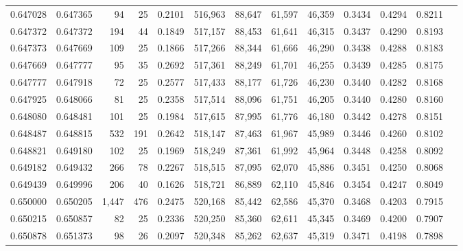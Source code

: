 \begin{tabular}{rrrrrrrrrrrrr}
0.647028 & 0.647365 &    94 &  25 &                                     0.2101 & 516,963 &  88,647 &  61,597 &  46,359 & 0.3434 & 0.4294 & 0.8211 \\
0.647372 & 0.647372 &   194 &  44 &                                     0.1849 & 517,157 &  88,453 &  61,641 &  46,315 & 0.3437 & 0.4290 & 0.8193 \\
0.647373 & 0.647669 &   109 &  25 &                                     0.1866 & 517,266 &  88,344 &  61,666 &  46,290 & 0.3438 & 0.4288 & 0.8183 \\
0.647669 & 0.647777 &    95 &  35 &                                     0.2692 & 517,361 &  88,249 &  61,701 &  46,255 & 0.3439 & 0.4285 & 0.8175 \\
0.647777 & 0.647918 &    72 &  25 &                                     0.2577 & 517,433 &  88,177 &  61,726 &  46,230 & 0.3440 & 0.4282 & 0.8168 \\
0.647925 & 0.648066 &    81 &  25 &                                     0.2358 & 517,514 &  88,096 &  61,751 &  46,205 & 0.3440 & 0.4280 & 0.8160 \\
0.648080 & 0.648481 &   101 &  25 &                                     0.1984 & 517,615 &  87,995 &  61,776 &  46,180 & 0.3442 & 0.4278 & 0.8151 \\
0.648487 & 0.648815 &   532 & 191 &                                     0.2642 & 518,147 &  87,463 &  61,967 &  45,989 & 0.3446 & 0.4260 & 0.8102 \\
0.648821 & 0.649180 &   102 &  25 &                                     0.1969 & 518,249 &  87,361 &  61,992 &  45,964 & 0.3448 & 0.4258 & 0.8092 \\
0.649182 & 0.649432 &   266 &  78 &                                     0.2267 & 518,515 &  87,095 &  62,070 &  45,886 & 0.3451 & 0.4250 & 0.8068 \\
0.649439 & 0.649996 &   206 &  40 &                                     0.1626 & 518,721 &  86,889 &  62,110 &  45,846 & 0.3454 & 0.4247 & 0.8049 \\
0.650000 & 0.650205 & 1,447 & 476 &                                     0.2475 & 520,168 &  85,442 &  62,586 &  45,370 & 0.3468 & 0.4203 & 0.7915 \\
0.650215 & 0.650857 &    82 &  25 &                                     0.2336 & 520,250 &  85,360 &  62,611 &  45,345 & 0.3469 & 0.4200 & 0.7907 \\
0.650878 & 0.651373 &    98 &  26 &                                     0.2097 & 520,348 &  85,262 &  62,637 &  45,319 & 0.3471 & 0.4198 & 0.7898 \\

\end{tabular}
